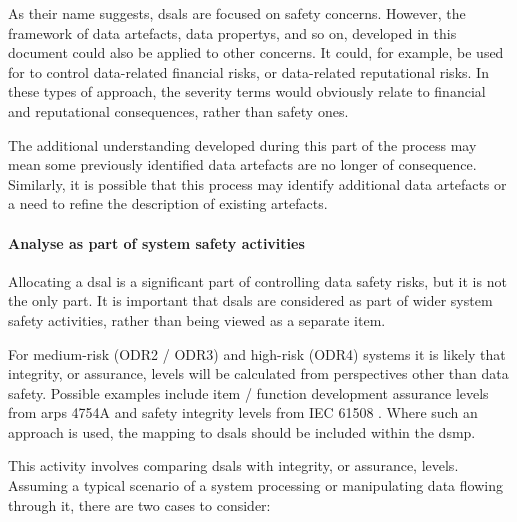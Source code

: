 As their name suggests, \glspl{dsal} are focused on safety concerns. However, the framework of \glspl{data artefact}, \glspl{data property}, and so on, developed in this document could also be applied to other concerns. It could, for example, be used for to control data-related financial risks, or data-related reputational risks. In these types of approach, the severity terms would obviously relate to financial and reputational consequences, rather than safety ones.

The additional understanding developed during this part of the process may mean some previously identified \glspl{data artefact} are no longer of consequence. Similarly, it is possible that this process may identify additional \glspl{data artefact} or a need to refine the description of existing artefacts.

\paragraph{Analyse  as part of system safety activities}
\label{bkm:activities:analyse:partofsystemsafetyactivities}
Allocating a \gls{dsal} is a significant part of controlling data safety risks, but it is not the only part. It is important that \glspl{dsal} are considered as part of wider system safety activities, rather than being viewed as a separate item.

For medium-risk (ODR2 / ODR3) and high-risk (ODR4) systems it is likely that \gls{integrity}, or assurance, levels will be calculated from perspectives other than data safety. Possible examples include item / function development assurance levels from \glspl{arp} 4754A \cite{citation:arp4754a2010guidelines} and safety \gls{integrity} levels from IEC 61508 \cite{citation:iec615083}.
Where such an approach is used, the mapping to \glspl{dsal} should be included within the \gls{dsmp}.

This activity involves comparing \glspl{dsal} with \gls{integrity}, or assurance, levels. Assuming a typical scenario of a system processing or manipulating data flowing through it, there are two cases to consider:

